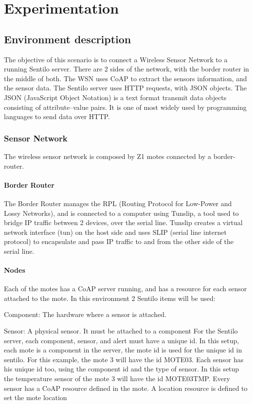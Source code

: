 \section{Experimentation}

\subsection{Environment description}

The objective of this scenario is to connect a Wireless Sensor Network to a running Sentilo server.
There are 2 sides of the network,
	with the border router in the middle of both.
The WSN uses CoAP to extract the sensors information,
	and the sensor data.
The Sentilo server uses HTTP requests,
	with JSON objects.
The JSON (JavaScript Object Notation) is a text format transmit data objects consisting of attribute–value pairs.
It is one of most widely used by programming languages to send data over HTTP.

\subsubsection{Sensor Network}
The wireless sensor network is composed by Z1 motes connected by a border-router.


\paragraph{Border Router}
The Border Router manages the RPL (Routing Protocol for Low-Power and Lossy Networks),
	and is connected to a computer using Tunslip,
	a tool used to bridge IP traffic between 2 devices,
	over the serial line.
Tunslip creates a virtual network interface (tun) on the host side and uses SLIP (serial line internet protocol) to encapsulate and pass IP traffic to and from the other side of the serial line.

\paragraph{Nodes}
Each of the motes has a CoAP server running,
	and has a resource for each sensor attached to the mote.
In this environment 2 Sentilo items will be used:

Component:
	The hardware where a sensor is attached.

Sensor:
	A physical sensor.
It must be attached to a component For the Sentilo server,
	each component,
	sensor,
	and alert must have a unique id.
In this setup,
	each mote is a component in the server,
	the mote id is used for the unique id in sentilo.
For this example,
	the mote 3 will have the id MOTE03.
Each sensor has his unique id too,
	using the component id and the type of sensor.
In this setup the temperature sensor of the mote 3 will have the id MOTE03TMP.
Every sensor has a CoAP resource defined in the mote.
A location resource is defined to set the mote location 

